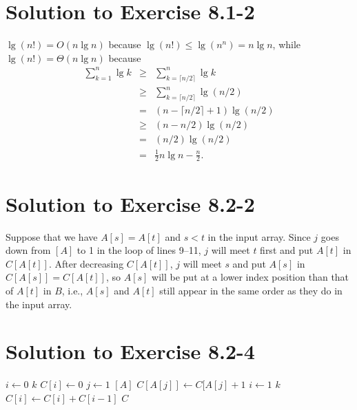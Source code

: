 \documentclass[a4paper, fleqn]{article}
\begin{document}
\section*{Solution to Exercise 8.1-2}

$\lg(n!) = O(n \lg n)$ because $\lg(n!) \leq \lg(n^n) = n \lg n$, while 
$\lg(n!) = \Theta(n \lg n)$ because
\begin{eqnarray*}
\sum_{k=1}^{n} \lg k
& \geq & \sum_{k=\lceil n / 2 \rceil}^n \lg k \\
& \geq & \sum_{k=\lceil n / 2 \rceil}^n \lg(n/2) \\
&  =   & (n - \lceil n / 2 \rceil + 1)\lg(n/2) \\
& \geq & (n - n / 2)\lg(n/2) \\
&  =   & (n/2)\lg(n/2) \\
&  =   & \frac{1}{2} n \lg n - \frac{n}{2}.
\end{eqnarray*}







\section*{Solution to Exercise 8.2-2}

Suppose that we have $A[s] = A[t]$ and $s < t$ in the input array. Since $j$ 
goes down from $[A]$ to 1 in the  loop of lines 9--11, $j$ 
will meet $t$ first and put $A[t]$ in $C[A[t]]$. After decreasing $C[A[t]]$, 
$j$ will meet $s$ and put $A[s]$ in $C[A[s]] = C[A[t]]$, so $A[s]$ will be put 
at a lower index position than that of $A[t]$ in $B$, i.e., $A[s]$ and $A[t]$ 
still appear in the same order as they do in the input array.







\section*{Solution to Exercise 8.2-4}

\begin{codebox}
\li \For $i \gets 0$ \To $k$
\li     \Do
            $C[i] \gets 0$
        \End
\li \For $j \gets 1$ \To {}$[A]$
\li     \Do
            $C[A[j]] \gets C[A[j] + 1$
        \End
\li \For $i \gets 1$ \To $k$
\li     \Do
            $C[i] \gets C[i] + C[i - 1]$
        \End
\li \Return $C$
\end{codebox}
\end{document}
